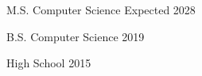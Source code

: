     {M.S. Computer Science}
    {Expected 2028}
    
    {B.S. Computer Science}
    {2019}

    {High School}
    {2015}
